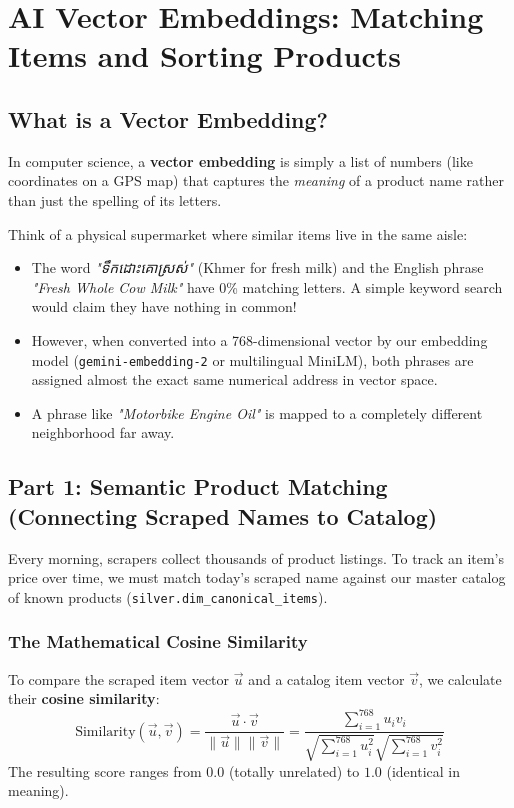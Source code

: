 \documentclass[11pt,a4paper,oneside]{article}
\newcommand{\khmer}[1]{{\khmerfont #1}}
\begin{document}
\newpage

\section{AI Vector Embeddings: Matching Items and Sorting Products}

\subsection{What is a Vector Embedding?}
In computer science, a \textbf{vector embedding} is simply a list of numbers (like coordinates on a GPS map) that captures the \textit{meaning} of a product name rather than just the spelling of its letters.

Think of a physical supermarket where similar items live in the same aisle:
\begin{itemize}
    \item The word \textit{"\khmer{ទឹកដោះគោស្រស់}"} (Khmer for fresh milk) and the English phrase \textit{"Fresh Whole Cow Milk"} have 0\% matching letters. A simple keyword search would claim they have nothing in common!
    \item However, when converted into a 768-dimensional vector by our embedding model (\texttt{gemini-embedding-2} or multilingual MiniLM), both phrases are assigned almost the exact same numerical address in vector space.
    \item A phrase like \textit{"Motorbike Engine Oil"} is mapped to a completely different neighborhood far away.
\end{itemize}

\subsection{Part 1: Semantic Product Matching (Connecting Scraped Names to Catalog)}
Every morning, scrapers collect thousands of product listings. To track an item's price over time, we must match today's scraped name against our master catalog of known products (\texttt{silver.dim\_canonical\_items}).

\subsubsection{The Mathematical Cosine Similarity}
To compare the scraped item vector $\vec{u}$ and a catalog item vector $\vec{v}$, we calculate their \textbf{cosine similarity}:
\begin{equation}
\text{Similarity}(\vec{u}, \vec{v}) = \frac{\vec{u} \cdot \vec{v}}{\|\vec{u}\| \|\vec{v}\|} = \frac{\sum_{i=1}^{768} u_i v_i}{\sqrt{\sum_{i=1}^{768} u_i^2} \sqrt{\sum_{i=1}^{768} v_i^2}}
\end{equation}
The resulting score ranges from $0.0$ (totally unrelated) to $1.0$ (identical in meaning).
\end{document}
